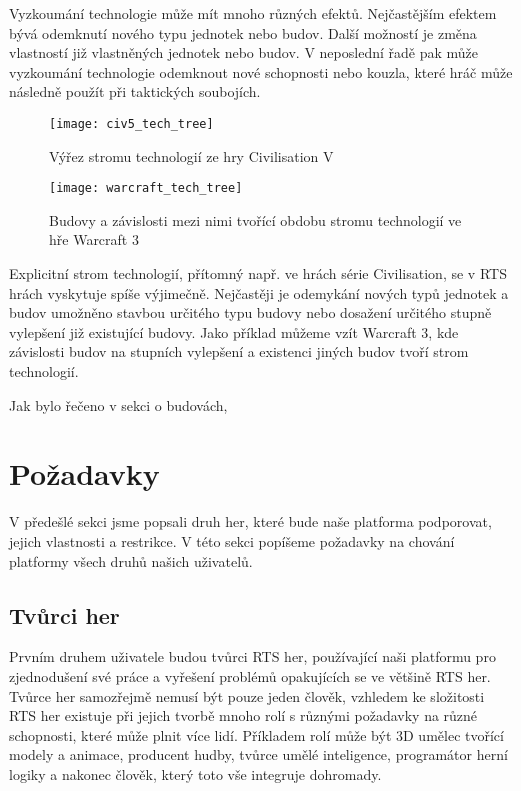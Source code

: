 Vyzkoumání technologie může mít mnoho různých efektů. Nejčastějším efektem bývá odemknutí nového typu jednotek nebo budov. Další možností je změna vlastností již vlastněných jednotek nebo budov. V neposlední řadě pak může vyzkoumání technologie odemknout nové schopnosti nebo kouzla, které hráč může následně použít při taktických soubojích. 

\begin{figure}[h]
	\label{fig:civ5techtree}
	\caption{Výřez stromu technologií ze hry Civilisation V}
	\centering
	\texttt{[image: civ5\_tech\_tree]}
\end{figure}


\begin{figure}[h]
	\label{fig:warcrafttechtree}
	\caption{Budovy a závislosti mezi nimi tvořící obdobu stromu technologií ve hře Warcraft 3}
	\centering
	\texttt{[image: warcraft\_tech\_tree]}
\end{figure}

Explicitní strom technologií, přítomný např. ve hrách série Civilisation, se v RTS hrách vyskytuje spíše výjimečně. Nejčastěji je odemykání nových typů jednotek a budov umožněno stavbou určitého typu budovy nebo dosažení určitého stupně vylepšení již existující budovy. Jako příklad můžeme vzít Warcraft 3, kde závislosti budov na stupních vylepšení a existenci jiných budov tvoří strom technologií. 

Jak bylo řečeno v sekci o budovách, 


\section{Požadavky}
V předešlé sekci jsme popsali druh her, které bude naše platforma podporovat, jejich vlastnosti a restrikce. V této sekci popíšeme požadavky na chování platformy všech druhů našich uživatelů.

\subsection{Tvůrci her}
Prvním druhem uživatele budou tvůrci RTS her, používající naši platformu pro zjednodušení své práce a vyřešení problémů opakujících se ve většině RTS her. Tvůrce her samozřejmě nemusí být pouze jeden člověk, vzhledem ke složitosti RTS her existuje při jejich tvorbě mnoho rolí s různými požadavky na různé schopnosti, které může plnit více lidí. Příkladem rolí může být 3D umělec tvořící modely a animace, producent hudby, tvůrce umělé inteligence, programátor herní logiky a nakonec člověk, který toto vše integruje dohromady.

